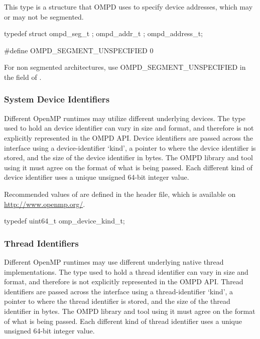 This type is a structure that OMPD uses to specify device addresses, 
which may or may not be segmented.

\format

\begin{ccppspecific}
\begin{ompEnv}
typedef struct {
  ompd_seg_t ;
  ompd_addr_t ;
} ompd_address_t;

#define OMPD_SEGMENT_UNSPECIFIED 0
\end{ompEnv}
\end{ccppspecific}


For non segmented architectures, use OMPD\_SEGMENT\_UNSPECIFIED in the  
field of .

\subsubsection{System Device Identifiers}

Different OpenMP runtimes may utilize different underlying devices.
The type used to hold an device identifier can vary in size and format, and 
therefore is not explicitly represented in the OMPD API. Device identifiers are 
passed across the interface using a device-identifier `kind', a pointer to where
the device identifier is stored, and the size of the device identifier in bytes.
The OMPD library and tool using it must agree on the format
of what is being passed.
Each different kind of device identifier uses a unique
unsigned 64-bit integer value.

Recommended values of  are defined in the  
header file, which is available on \url{http://www.openmp.org/}. 

\label{ompd:omp_device_kind_t}
\format

	\begin{ccppspecific}
	\begin{ompSyntax}
typedef uint64_t omp_device_kind_t;
	\end{ompSyntax}
	\end{ccppspecific}


\subsubsection{Thread Identifiers}

Different OpenMP runtimes may use different underlying native
thread implementations.
The type used to hold a thread identifier can vary in size and format, and 
therefore is not explicitly represented in the OMPD API. Thread identifiers are 
passed across the interface using a thread-identifier `kind', a pointer to where
the thread identifier is stored, and the size of the thread identifier in bytes.
The OMPD library and tool using it must agree on the format
of what is being passed.
Each different kind of thread identifier uses a unique
unsigned 64-bit integer value.

